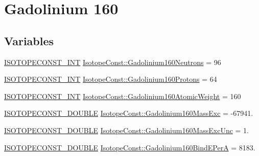 \hypertarget{group___isotope_const-_gadolinium-_gd160}{}\section{Gadolinium 160}
\label{group___isotope_const-_gadolinium-_gd160}
\subsection*{Variables}
\begin{DoxyCompactItemize}
\item 
\mbox{\hyperlink{group___isotope_const-_macros_ga5f18360b3e99483a35c32d789e62621c}{I\+S\+O\+T\+O\+P\+E\+C\+O\+N\+S\+T\+\_\+\+I\+NT}} \mbox{\hyperlink{group___isotope_const-_gadolinium-_gd160_ga301b68f7c9824bfa24c73178055573cf}{Isotope\+Const\+::\+Gadolinium160\+Neutrons}} = 96
\item 
\mbox{\hyperlink{group___isotope_const-_macros_ga5f18360b3e99483a35c32d789e62621c}{I\+S\+O\+T\+O\+P\+E\+C\+O\+N\+S\+T\+\_\+\+I\+NT}} \mbox{\hyperlink{group___isotope_const-_gadolinium-_gd160_ga31e537d6d79708cefeb507b52496512a}{Isotope\+Const\+::\+Gadolinium160\+Protons}} = 64
\item 
\mbox{\hyperlink{group___isotope_const-_macros_ga5f18360b3e99483a35c32d789e62621c}{I\+S\+O\+T\+O\+P\+E\+C\+O\+N\+S\+T\+\_\+\+I\+NT}} \mbox{\hyperlink{group___isotope_const-_gadolinium-_gd160_gac1925bcbe6c56762dbefdca653d80438}{Isotope\+Const\+::\+Gadolinium160\+Atomic\+Weight}} = 160
\item 
\mbox{\hyperlink{group___isotope_const-_macros_ga8f45a7272ce02c0b4c65c44636ed719a}{I\+S\+O\+T\+O\+P\+E\+C\+O\+N\+S\+T\+\_\+\+D\+O\+U\+B\+LE}} \mbox{\hyperlink{group___isotope_const-_gadolinium-_gd160_gafe51a47096fe60de46cb839149bbd6ce}{Isotope\+Const\+::\+Gadolinium160\+Mass\+Exc}} = -\/67941.
\item 
\mbox{\hyperlink{group___isotope_const-_macros_ga8f45a7272ce02c0b4c65c44636ed719a}{I\+S\+O\+T\+O\+P\+E\+C\+O\+N\+S\+T\+\_\+\+D\+O\+U\+B\+LE}} \mbox{\hyperlink{group___isotope_const-_gadolinium-_gd160_gae4dc2c77ddbf20cf3a1510212d1e59d7}{Isotope\+Const\+::\+Gadolinium160\+Mass\+Exc\+Unc}} = 1.
\item 
\mbox{\hyperlink{group___isotope_const-_macros_ga8f45a7272ce02c0b4c65c44636ed719a}{I\+S\+O\+T\+O\+P\+E\+C\+O\+N\+S\+T\+\_\+\+D\+O\+U\+B\+LE}} \mbox{\hyperlink{group___isotope_const-_gadolinium-_gd160_ga05778b0f9cb5fa10f67852ed57785740}{Isotope\+Const\+::\+Gadolinium160\+Bind\+E\+PerA}} = 8183.

\end{DoxyCompactItemize}
